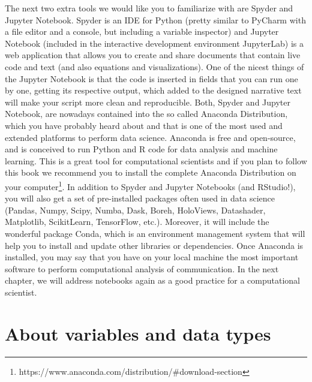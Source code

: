 The next two extra tools we would like you to familiarize with are Spyder and Jupyter Notebook. Spyder is an IDE for Python (pretty similar to PyCharm with a file editor and a console, but including a variable inspector) and Jupyter Notebook (included in the interactive development environment JupyterLab) is a web application that allows you to create and share documents that contain live code and text (and also equations and visualizations).  One of the nicest things of the Jupyter Notebook is that the code is inserted in fields that you can run one by one, getting its respective output, which added to the designed narrative text will make your script more clean and reproducible. Both, Spyder and Jupyter Notebook, are nowadays contained into the so called Anaconda Distribution, which you have probably heard about and that is one of the most used and extended platforms to perform data science. Anaconda is free and open-source, and is conceived to run Python and R code for data analysis and machine learning. This is a great tool for computational scientists and if you plan to follow this book we recommend you to install the complete Anaconda Distribution on your computer\footnote{https://www.anaconda.com/distribution/\#download-section}. In addition to Spyder and Jupyter Notebooks (and RStudio!), you will also get a set of pre-installed packages often used in data science (Pandas, Numpy, Scipy, Numba, Dask, Boreh, HoloViews, Datashader, Matplotlib, ScikitLearn, TensorFlow, etc.). Moreover, it will include the wonderful package Conda, which is an environment management system that will help you to install and update other libraries or dependencies. Once Anaconda is installed, you may say that you have on your local machine the most important software to perform computational analysis of communication. In the next chapter, we will address notebooks again as a good practice for a computational scientist.

\section{About variables and data types}

